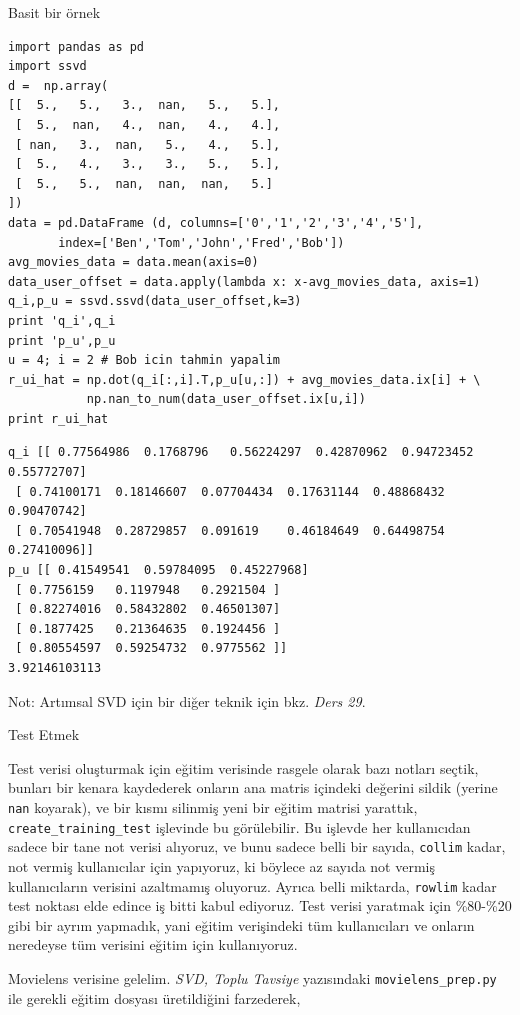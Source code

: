 \documentclass[12pt,fleqn]{article}\usepackage{../../common}
\begin{document}
Basit bir örnek

\begin{verbatim}
import pandas as pd
import ssvd
d =  np.array(
[[  5.,   5.,   3.,  nan,   5.,   5.],
 [  5.,  nan,   4.,  nan,   4.,   4.],
 [ nan,   3.,  nan,   5.,   4.,   5.],
 [  5.,   4.,   3.,   3.,   5.,   5.],
 [  5.,   5.,  nan,  nan,  nan,   5.]
])
data = pd.DataFrame (d, columns=['0','1','2','3','4','5'],
       index=['Ben','Tom','John','Fred','Bob'])
avg_movies_data = data.mean(axis=0)
data_user_offset = data.apply(lambda x: x-avg_movies_data, axis=1)
q_i,p_u = ssvd.ssvd(data_user_offset,k=3)
print 'q_i',q_i
print 'p_u',p_u
u = 4; i = 2 # Bob icin tahmin yapalim
r_ui_hat = np.dot(q_i[:,i].T,p_u[u,:]) + avg_movies_data.ix[i] + \
           np.nan_to_num(data_user_offset.ix[u,i])
print r_ui_hat
\end{verbatim}

\begin{verbatim}
q_i [[ 0.77564986  0.1768796   0.56224297  0.42870962  0.94723452  0.55772707]
 [ 0.74100171  0.18146607  0.07704434  0.17631144  0.48868432  0.90470742]
 [ 0.70541948  0.28729857  0.091619    0.46184649  0.64498754  0.27410096]]
p_u [[ 0.41549541  0.59784095  0.45227968]
 [ 0.7756159   0.1197948   0.2921504 ]
 [ 0.82274016  0.58432802  0.46501307]
 [ 0.1877425   0.21364635  0.1924456 ]
 [ 0.80554597  0.59254732  0.9775562 ]]
3.92146103113
\end{verbatim}

Not: Artımsal SVD için bir diğer teknik için bkz. {\em Ders 29}. 

Test Etmek

Test verisi oluşturmak için eğitim verisinde rasgele olarak bazı notları seçtik,
bunları bir kenara kaydederek onların ana matris içindeki değerini sildik
(yerine \verb!nan!  koyarak), ve bir kısmı silinmiş yeni bir eğitim matrisi
yarattık, \verb!create_training_test! işlevinde bu görülebilir. Bu işlevde her
kullanıcıdan sadece bir tane not verisi alıyoruz, ve bunu sadece belli bir
sayıda, \verb!collim! kadar, not vermiş kullanıcılar için yapıyoruz, ki böylece
az sayıda not vermiş kullanıcıların verisini azaltmamış oluyoruz. Ayrıca belli
miktarda, \verb!rowlim! kadar test noktası elde edince iş bitti kabul
ediyoruz. Test verisi yaratmak için \%80-\%20 gibi bir ayrım yapmadık, yani
eğitim verişindeki tüm kullanıcıları ve onların neredeyse tüm verisini eğitim
için kullanıyoruz.

Movielens verisine gelelim. {\em SVD, Toplu Tavsiye} yazısındaki
\verb!movielens_prep.py! ile gerekli eğitim dosyası üretildiğini farzederek,
\end{document}
